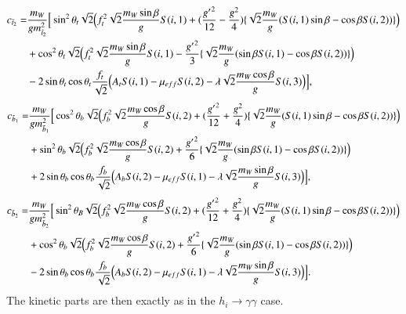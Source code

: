 \documentclass[final,3p,times,pdflatex]{elsarticle}
\begin{document}
\begin{equation}
\begin{aligned}
c_{\tilde{t}_2} = & {m_{W} \over g m_{\tilde{t}_2}^2}\Big[\sin^2 \theta_t \sqrt{2}\Big(f_{t}^2\sqrt{2} {m_{W} \sin\beta \over g}S(i,1) + ({{g'}^2 \over 12} - {g^2 \over 4})\{\sqrt{2} {m_{W} \over g}(S(i,1)\sin\beta - \cos\beta S(i,2))\}\Big) \\ & + \cos^2 \theta_t \sqrt{2} \Big(f_{t}^2 \sqrt{2} {m_{W} \sin\beta \over g}S(i,1) - {{g'}^2 \over 3}\{\sqrt{2} {m_{W} \over g}(\sin\beta S(i,1) - \cos\beta S(i,2))\}\Big) \\ & - 2\sin\theta_t \cos\theta_t {f_{t} \over \sqrt{2}}\Big(A_{t}S(i,1) - \mu_{eff}S(i,2) - \lambda\sqrt{2}{m_{W} \cos\beta \over g}S(i,3)\Big)\Big],
\end{aligned}
\end{equation}
\begin{equation}
\begin{aligned}
c_{\tilde{b}_1} = & {m_{W} \over g m_{\tilde{b}_1}^2}\Big[\cos^2 \theta_b \sqrt{2}\Big(f_{b}^2\sqrt{2} {m_{W} \cos\beta \over g}S(i,2) + ({{g'}^2 \over 12} + {g^2 \over 4})\{\sqrt{2} {m_{W} \over g}(S(i,1)\sin\beta - \cos\beta S(i,2))\}\Big) \\ & + \sin^2 \theta_b \sqrt{2} \Big(f_{b}^2 \sqrt{2} {m_{W} \cos\beta \over g}S(i,2) + {{g'}^2 \over 6}\{\sqrt{2} {m_{W} \over g}(\sin\beta S(i,1) - \cos\beta S(i,2))\}\Big) \\ & + 2\sin\theta_b \cos\theta_b {f_{b} \over \sqrt{2}}\Big(A_{b}S(i,2) - \mu_{eff}S(i,1) - \lambda\sqrt{2}{m_{W} \sin\beta \over g}S(i,3)\Big)\Big],
\end{aligned}
\end{equation}
\begin{equation}
\begin{aligned}
c_{\tilde{b}_2} = & {m_{W} \over g m_{\tilde{b}_2}^2}\Big[\sin^2 \theta_B \sqrt{2}\Big(f_{b}^2\sqrt{2} {m_{W} \cos\beta \over g}S(i,2) + ({{g'}^2 \over 12} + {g^2 \over 4})\{\sqrt{2} {m_{W} \over g}(S(i,1)\sin\beta - \cos\beta S(i,2))\}\Big) \\ & + \cos^2 \theta_b \sqrt{2} \Big(f_{b}^2 \sqrt{2} {m_{W} \cos\beta \over g}S(i,2) + {{g'}^2 \over 6}\{\sqrt{2} {m_{W} \over g}(\sin\beta S(i,1) - \cos\beta S(i,2))\}\Big) \\ & - 2\sin\theta_b \cos\theta_b {f_{b} \over \sqrt{2}}\Big(A_{b}S(i,2) - \mu_{eff}S(i,1) - \lambda\sqrt{2}{m_{W} \sin\beta \over g}S(i,3)\Big)\Big].
\end{aligned}
\end{equation}
The kinetic parts are then exactly as in the $h_{i} \rightarrow \gamma \gamma$ case.
\end{document}
